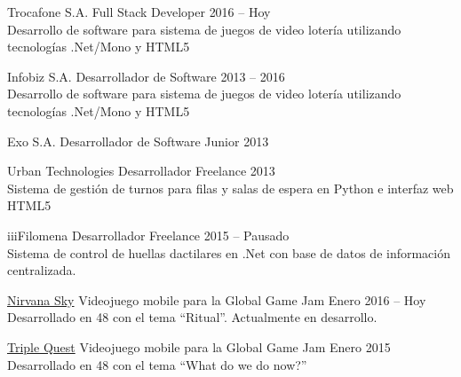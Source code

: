 \documentclass[10pt,a4paper]{article}
\begin{document}
\spacedhrule{0.8em}{-0.4em}


\vspace{0.2em}
\headedsection
    {Trocafone S.A.}
    {\textsc{}}{
    \headedsubsection
        {Full Stack Developer}
        {2016 -- Hoy}
        {\\Desarrollo de software para sistema de juegos de video lotería utilizando tecnologías .Net/Mono y HTML5}
}

\vspace{0.2em}
\headedsection
    {Infobiz S.A.}
    {\textsc{}}{
    \headedsubsection
        {Desarrollador de Software}
        {2013 -- 2016}
        {\\Desarrollo de software para sistema de juegos de video lotería utilizando tecnologías .Net/Mono y HTML5}
}

\vspace{0.2em}
\headedsection
    {Exo S.A.}
    {\textsc{}}{
    \headedsubsection
        {Desarrollador de Software Junior}
        {2013}
        {}
}

\vspace{0.2em}
\headedsection
    {Urban Technologies}
    {\textsc{}}{
    \headedsubsection
        {Desarrollador Freelance}
        {2013}
        {\\Sistema de gestión de turnos para filas y salas de espera en Python e interfaz web HTML5}
}

\vspace{0.2em}
\headedsection
    {iiiFilomena}
    {\textsc{}}{
    \headedsubsection
        {Desarrollador Freelance}
        {2015 -- Pausado}
        {\\Sistema de control de huellas dactilares en .Net con base de datos de información centralizada.}
}

\pagebreak

\spacedhrule{0.8em}{-0.4em}


\vspace{0.2em}
\headedsection
    {\href{http://globalgamejam.org/2016/games/nirvana-sky}{Nirvana Sky}}
    {\textsc{}}{
    \headedsubsection
        {Videojuego mobile para la Global Game Jam}
        {Enero 2016 -- Hoy}
        {\\Desarrollado en 48 con el tema ``Ritual''. Actualmente en desarrollo.}
}

\vspace{0.2em}
\headedsection
    {\href{http://globalgamejam.org/2015/games/triple-quest}{Triple Quest}}
    {\textsc{}}{
    \headedsubsection
        {Videojuego mobile para la Global Game Jam}
        {Enero 2015}
        {\\Desarrollado en 48 con el tema ``What do we do now?''}
}
\end{document}
